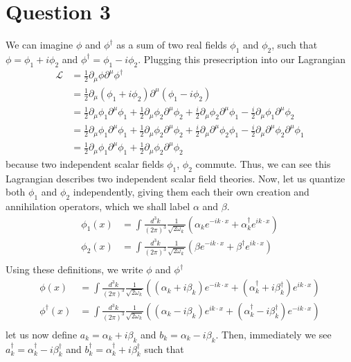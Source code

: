 \documentclass[12pt]{article}
\newcommand{\delmu}{\partial_{\mu}}
\newcommand{\delMu}{\partial^{\mu}}
\begin{document}
\section*{Question 3}
We can imagine $\phi$ and $\phi^{\dagger}$ as a sum of two real fields $\phi_1$ 
and $\phi_2$, such that $\phi = \phi_1 + i\phi_2$ and $\phi^{\dagger} = \phi_1 -
i\phi_2$. Plugging this presecription into our Lagrangian
\begin{align*}
   \mathcal{L} &= \frac{1}{2}\delmu\phi\delMu\phi^{\dagger} \\ 
               &= \frac{1}{2}\delmu(\phi_1 + i \phi_2)\delMu(\phi_1 - i\phi_2) \\
               &= \frac{1}{2}\delmu\phi_1\delMu\phi_1
               + \frac{1}{2}\delmu\phi_2\delMu\phi_2
               + \frac{i}{2}\delmu\phi_2\delMu\phi_1
               - \frac{i}{2}\delmu\phi_1\delMu\phi_2 \\
               &= \frac{1}{2}\delmu\phi_1\delMu\phi_1
               + \frac{1}{2}\delmu\phi_2\delMu\phi_2
               + \frac{i}{2}\delmu\delMu\phi_2\phi_1
               - \frac{i}{2}\delmu\delMu\phi_2\delMu\phi_1 \\
               &= \frac{1}{2}\delmu\phi_1\delMu\phi_1
               + \frac{1}{2}\delmu\phi_2\delMu\phi_2
\end{align*}
because two independent scalar fields $\phi_1$, $\phi_2$ commute. Thus, we can
see this Lagrangian describes two independent scalar field theories. Now,
let us quantize both $\phi_1$ and $\phi_2$ independently, giving them each
their own creation and annihilation operators, which we shall label $\alpha$ 
and $\beta$.
\begin{align*}
   \phi_1(x) &= \int \frac{d^3k}{(2\pi)^3} \frac{1}{\sqrt{2\omega_k}} (\alpha_k
   e^{-ik\cdot x} + \alpha_k^{\dagger}e^{ik\cdot x}) \\
   \phi_2(x) &= \int \frac{d^3k}{(2\pi)^3} \frac{1}{\sqrt{2\omega_k}} (\beta
   e^{-ik\cdot x} + \beta^{\dagger}e^{ik\cdot x}) \\
\end{align*}
Using these definitions, we write $\phi$ and $\phi^{\dagger}$
\begin{align*}
   \phi(x) &= \int \frac{d^3k}{(2\pi)^3} \frac{1}{\sqrt{2\omega_k}} \left(
   (\alpha_k + i\beta_k)e^{-ik\cdot x} + (\alpha^{\dagger}_k +
   i\beta^{\dagger}_k)e^{ik\cdot x} \right) \\
   \phi^{\dagger}(x) &= \int \frac{d^3k}{(2\pi)^3} \frac{1}{\sqrt{2\omega_k}}
   \left( (\alpha_k - i\beta_k)e^{ik\cdot x} + (\alpha^{\dagger}_k -
   i\beta^{\dagger}_k)e^{-ik\cdot x} \right) \\
\end{align*}
let us now define $a_k = \alpha_k + i\beta_k$ and $b_k = \alpha_k - i\beta_k$. Then,
immediately we see $a^{\dagger}_k = \alpha_k^{\dagger} - i\beta_k^{\dagger}$ and 
$b^{\dagger}_k = \alpha_k^{\dagger} + i \beta_k^{\dagger}$ such that
\end{document}
